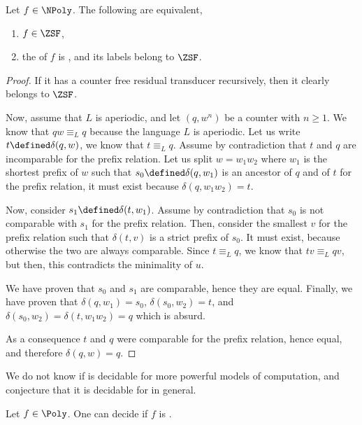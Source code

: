 \begin{conjecture}
    Let $f \in \NPoly$. The following are equivalent,
    \begin{enumerate}
        \item $f \in \ZSF$,
        \item the  of $f$
            is ,
            and its labels belong to $\ZSF$.
    \end{enumerate}
\end{conjecture}
\begin{proof}
    If it has a counter free residual transducer recursively, then
    it clearly belongs to $\ZSF$.


    Now, assume that $L$ is aperiodic, and let $(q,w^n)$ be a counter with $n
    \geq 1$. We know that $qw \equiv_L q$ because the language $L$ is
    aperiodic. Let us write $t \defined \delta(q,w)$, we know that $t \equiv_L
    q$. Assume by contradiction that $t$ and $q$ are incomparable for the
    prefix relation. Let us split $w = w_1 w_2$ where $w_1$ is the shortest
    prefix of $w$ such that $s_0 \defined \delta(q,w_1)$ is an ancestor of $q$
    and of $t$ for the prefix relation, it must exist because $\delta(q,w_1
    w_2) = t$.

    Now, consider $s_1 \defined \delta(t, w_1)$. Assume by contradiction that
    $s_0$ is not comparable with $s_1$ for the prefix relation. Then, consider
    the smallest $v$ for the prefix relation such that $\delta(t, v)$ is a
    strict prefix of $s_0$. It must exist, because otherwise the two are always
    comparable. Since $t \equiv_L q$, we know that $tv \equiv_L qv$, but then,
    this contradicts the minimality of $u$.

    We have proven that $s_0$ and $s_1$ are comparable, hence they
    are equal.
    Finally, we have proven that $\delta(q, w_1) = s_0$,
    $\delta(s_0, w_2) = t$, and $\delta(s_0, w_2) = \delta(t, w_1w_2) = q$ which is absurd.

    As a consequence $t$ and $q$ were comparable for the prefix relation,
    hence equal, and therefore $\delta(q, w) = q$.
\end{proof}

We do not know if  is decidable for more powerful models of
computation, and conjecture that it is decidable for 
in general.

\begin{conjecture}
    Let $f \in \Poly$. One can decide if $f$ is .
\end{conjecture}


